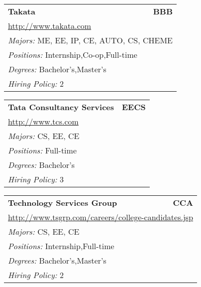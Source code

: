 \documentclass[twoside]{article}
\begin{document}
\begin{center}
\begin{multicols}{3}
\begin{FlushLeft}
\begin{minipage}{\columnwidth}
\end{minipage}
 
\begin{minipage}{\columnwidth}\begin{tabularx}{.95\columnwidth}{Xr}
                 {\Large\bf Takata} & {\Large\bf BBB}\\
    \multicolumn{2}{p{.95\columnwidth}}{\url{http://www.takata.com}}\\
    \multicolumn{2}{p{.95\columnwidth}}{\emph{Majors:} ME, EE, IP, CE, AUTO, CS, CHEME}\\
    \multicolumn{2}{p{.95\columnwidth}}{\emph{Positions:} Internship,Co-op,Full-time}\\
    \multicolumn{2}{p{.95\columnwidth}}{\emph{Degrees:} Bachelor's,Master's}\\
    \multicolumn{2}{p{.95\columnwidth}}{\emph{Hiring Policy:} 2}\\
    \end{tabularx}
    
\end{minipage}
 
\begin{minipage}{\columnwidth}\begin{tabularx}{.95\columnwidth}{Xr}
                 {\Large\bf Tata Consultancy Services} & {\Large\bf EECS}\\
    \multicolumn{2}{p{.95\columnwidth}}{\url{http://www.tcs.com}}\\
    \multicolumn{2}{p{.95\columnwidth}}{\emph{Majors:} CS, EE, CE}\\
    \multicolumn{2}{p{.95\columnwidth}}{\emph{Positions:} Full-time}\\
    \multicolumn{2}{p{.95\columnwidth}}{\emph{Degrees:} Bachelor's}\\
    \multicolumn{2}{p{.95\columnwidth}}{\emph{Hiring Policy:} 3}\\
    \end{tabularx}
    
\end{minipage}
 
\begin{minipage}{\columnwidth}\begin{tabularx}{.95\columnwidth}{Xr}
                 {\Large\bf Technology Services Group} & {\Large\bf CCA}\\
    \multicolumn{2}{p{.95\columnwidth}}{\url{http://www.tsgrp.com/careers/college-candidates.jsp}}\\
    \multicolumn{2}{p{.95\columnwidth}}{\emph{Majors:} CS, EE, CE}\\
    \multicolumn{2}{p{.95\columnwidth}}{\emph{Positions:} Internship,Full-time}\\
    \multicolumn{2}{p{.95\columnwidth}}{\emph{Degrees:} Bachelor's,Master's}\\
    \multicolumn{2}{p{.95\columnwidth}}{\emph{Hiring Policy:} 2}\\
    \end{tabularx}
    

\end{minipage}
\end{FlushLeft}
\end{multicols}
\end{center}
\end{document}
